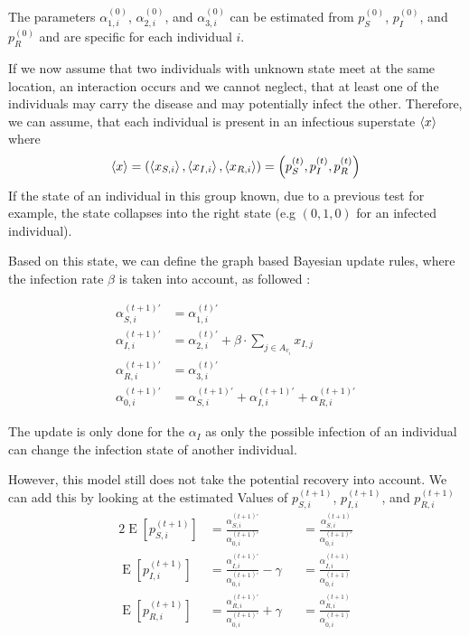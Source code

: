 The parameters $\alpha_{1,i}^{(0)}$, $\alpha_{2,i}^{(0)}$, and $\alpha_{3,i}^{(0)}$ can be estimated from $p_S^{(0)}$, $p_I^{(0)}$, and $p_R^{(0)}$ and are specific for each individual $i$.

If we now assume that two individuals with unknown state meet at the same location, an interaction occurs and we cannot neglect, that at least one of the individuals may carry the disease and may potentially infect the other. Therefore, we can assume, that each individual is present in an infectious superstate $\braket{x}$ where
\begin{equation}
    \braket{x} = \left(\braket{x_{S,i}}, \braket{x_{I,i}}, \braket{x_{R,i}}\right) = \left(p_S^{(t)},p_I^{(t)},p_R^{(t)}\right)
\end{equation}
If the state of an individual in this group known, due to a previous test for example, the state collapses into the right state (e.g $(0,1,0)$ for an infected individual).

Based on this state, we can define the graph based Bayesian update rules, where the infection rate $\beta$ is taken into account, as followed \cite{rice2006mathematical}:

\begin{align}
    \alpha_{S,i}^{(t+1)\prime} &= \alpha_{1,i}^{(t)\prime}\\
    \alpha_{I,i}^{(t+1)\prime} &= \alpha_{2,i}^{(t)\prime} + \beta \cdot
    \sum_{j\in A_{v_i}}  x_{I,j}\\
    \alpha_{R,i}^{(t+1)\prime} &= \alpha_{3,i}^{(t)\prime}\\
    \alpha_{0,i}^{(t+1)\prime} &= \alpha_{S,i}^{(t+1)\prime}+\alpha_{I,i}^{(t+1)\prime}+\alpha_{R,i}^{(t+1)\prime}
\end{align}

The update is only done for the $\alpha_I$ as only the possible infection of an individual can change the infection state of another individual.

However, this model still does not take the potential recovery into account. We can add this by looking at the estimated Values of $p_{S,i}^{(t+1)}$, $p_{I,i}^{(t+1)}$, and $p_{R,i}^{(t+1)}$ 
\begin{alignat}{2}
    \operatorname{E}[p_{S,i}^{(t+1)}] &= \frac{\alpha_{S,i}^{(t+1)\prime}}{\alpha_{0,i}^{(t+1)\prime}} & &= \frac{\alpha_{S,i}^{(t+1)}}{\alpha_{0,i}^{(t+1)\prime}} \\
    \operatorname{E}[p_{I,i}^{(t+1)}]&= \frac{\alpha_{I,i}^{(t+1)\prime}}{\alpha_{0,i}^{(t+1)\prime}}-\gamma & &=\frac{\alpha_{I,i}^{(t+1)}}{\alpha_{0,i}^{(t+1)}} \\
    \operatorname{E}[p_{R,i}^{(t+1)}]&= \frac{\alpha_{R,i}^{(t+1)\prime}}{\alpha_{0,i}^{(t+1)\prime}}+\gamma & &= \frac{\alpha_{R,i}^{(t+1)}}{\alpha_{0,i}^{(t+1)}}
\end{alignat}

